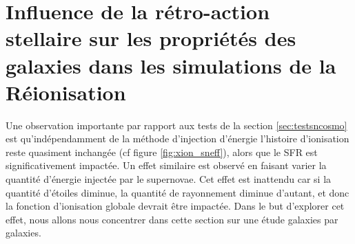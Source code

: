\chapter[Rétro-action stellaire]{Influence de la rétro-action stellaire sur les propriétés des galaxies dans les simulations de la Réionisation}
\label{sec:galaxies}


Une observation importante par rapport aux tests de la section \ref{sec:testsncosmo} est qu’indépendamment de la méthode d'injection d'énergie l'histoire d'ionisation reste quasiment inchangée (cf figure \ref{fig:xion_sneff}), alors que le \ac{SFR} est significativement impactée.
Un effet similaire est observé en faisant varier la quantité d'énergie injectée par le supernovae.
Cet effet est inattendu car si la quantité d'étoiles diminue, la quantité de rayonnement diminue d'autant, et donc la fonction d'ionisation globale devrait être impactée.
Dans le but d'explorer cet effet, nous allons nous concentrer dans cette section sur une étude galaxies par galaxies.


